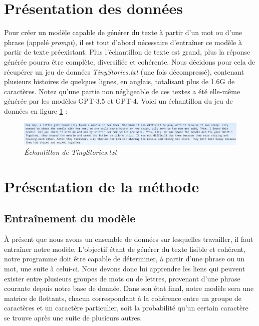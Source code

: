 \documentclass[12pt]{article}
\begin{document}
\section{Présentation des données}

Pour créer un modèle capable de générer du texte à partir d'un mot ou d'une phrase (appelé \textit{prompt}), il est tout d'abord nécessaire d'entraîner ce modèle à partir de texte préexistant. Plus l'échantillon de texte est grand, plus la réponse générée pourra être complète, diversifiée et cohérente. Nous décidons pour cela de récupérer un jeu de données \textit{TinyStories.txt\footnotemark[1]} (une fois décompressé), contenant plusieurs histoires de quelques lignes, en anglais, totalisant plus de 1.6G de caractères. Notez qu'une partie non négligeable de ces textes a été elle-même générée par les modèles GPT-3.5 et GPT-4. Voici un échantillon du jeu de données en figure \ref{fig:echantTS} : 

\begin{figure}[h]
	\centering
    \includegraphics[scale=0.26]{./utils/EchantillonTinyStories.png}
    \caption{\textit{Échantillon de TinyStories.txt}}
    \label{fig:echantTS}
\end{figure}

\section{Présentation de la méthode}

\subsection{Entraînement du modèle}

À présent que nous avons un ensemble de données sur lesquelles travailler, il faut entraîner notre modèle. L'objectif étant de générer du texte lisible et cohérent, notre programme doit être capable de déterminer, à partir d'une phrase ou un mot, une suite à celui-ci. Nous devons donc lui apprendre les liens qui peuvent exister entre plusieurs groupes de mots ou de lettres, provenant d'une phrase courante depuis notre base de donnée. Dans son état final, notre modèle sera une matrice de flottants, chacun correspondant à la cohérence entre un groupe de caractères et un caractère particulier, soit la probabilité qu'un certain caractère se trouve après une suite de plusieurs autres.\\
\end{document}
